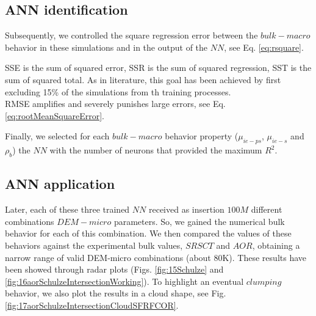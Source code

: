 % 

\subsection{ANN identification}
\label{subsec:annmodeliden}
Subsequently, we controlled the square regression error between the $bulk-macro$
behavior in these simulations and in the output of the $NN$, see Eq.
\ref{eq:rsquare}.

SSE is the sum of squared error, SSR is the sum of squared regression, SST is
the sum of squared total.
As in literature, this goal has been achieved by first excluding 15\% of the
simulations from th  training processes.\\

RMSE amplifies and severely punishes large errors, see Eq.
\ref{eq:rootMeanSquareError}.



Finally, we selected for each $bulk-macro$ behavior property ($\mu_{ie-ps}$, $\mu_{ie-s}$ and $\rho_b$) the $NN$ with the 
number of neurons that provided the maximum $R^2$.


% 

\subsection{ANN application}
\label{subsec:annapplication}

Later, each of these three trained $NN$ received as insertion $100M$ different
combinations $DEM-micro$ parameters.
So, we gained the numerical bulk behavior for each of this combination. 
We then compared the values of these behaviors against the experimental bulk
values, $SRSCT$ and $AOR$, obtaining a narrow range of valid DEM-micro
combinations (about 80K).
These results have been showed through radar plots (Figs. \ref{fig:15Schulze}
and \ref{fig:16aorSchulzeIntersectionWorking}).
To highlight an eventual $clumping$ behavior, we also plot the results in a
cloud shape, see Fig. \ref{fig:17aorSchulzeIntersectionCloudSFRFCOR}.

%


% 

